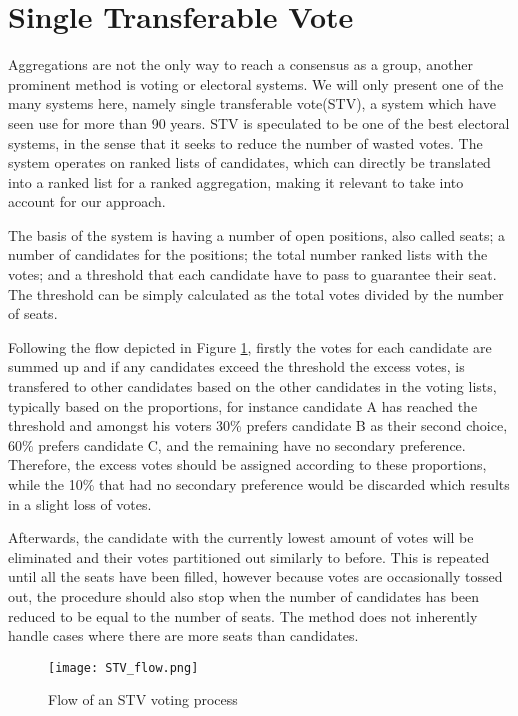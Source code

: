 
\section{Single Transferable Vote} \label{sec:stv}
Aggregations are not the only way to reach a consensus as a group, another prominent method is voting or electoral systems. We will only present one of the many systems here, namely single transferable vote(STV), a system which have seen use for more than 90 years\cite{stvireland}.
STV is speculated to be one of the best electoral systems, in the sense that it seeks to reduce the number of wasted votes. The system operates on ranked lists of candidates, which can directly be translated into a ranked list for a ranked aggregation, making it relevant to take into account for our approach.

The basis of the system is having a number of open positions, also called seats; a number of candidates for the positions; the total number ranked lists with the votes; and a threshold that each candidate have to pass to guarantee their seat. The threshold can be simply calculated as the total votes divided by the number of seats\cite{stv}.

Following the flow depicted in Figure \ref{fig:stvflow}, firstly the votes for each candidate are summed up and if any candidates exceed the threshold the excess votes, is transfered to other candidates based on the other candidates in the voting lists, typically based on the proportions, for instance candidate A has reached the threshold and amongst his voters 30\% prefers candidate B as their second choice, 60\% prefers candidate C, and the remaining have no secondary preference. Therefore, the excess votes should be assigned according to these proportions, while the 10\% that had no secondary preference would be discarded which results in a slight loss of votes.

Afterwards, the candidate with the currently lowest amount of votes will be eliminated and their votes partitioned out similarly to before. This is repeated until all the seats have been filled, however because votes are occasionally tossed out, the procedure should also stop when the number of candidates has been reduced to be equal to the number of seats. The method does not inherently handle cases where there are more seats than candidates.

\begin{figure}
	\centering
	\texttt{[image: STV\_flow.png]}
	\caption{Flow of an STV voting process}
	\label{fig:stvflow}
\end{figure}